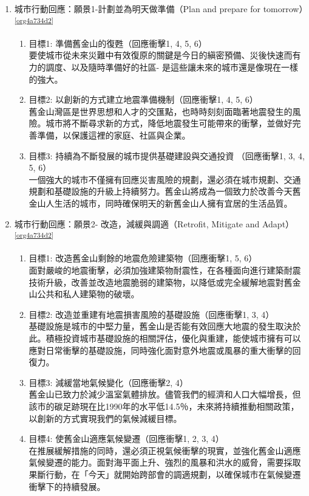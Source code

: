\documentclass[a4paper,12pt]{article}
\begin{document}
\begin{enumerate}
\begin{enumerate}
\item 城市行動回應：願景1-計劃並為明天做準備（Plan and prepare for tomorrow）\textsuperscript{\ref{org4a734d2}}
\label{sec:org3c67873}
\begin{enumerate}
\item 目標1: 準備舊金山的復甦（回應衝擊1, 4, 5, 6）\\
要使城市從未來災難中有效復原的關鍵是今日的縝密預備、災後快速而有力的調度、以及隨時準備好的社區- 是這些讓未來的城市還是像現在一樣的強大。\\
\item 目標2: 以創新的方式建立地震準備機制（回應衝擊1, 4, 5, 6）\\
舊金山灣區是世界思想和人才的交匯點，也時時刻刻面臨著地震發生的風險。城市將不斷尋求新的方式，降低地震發生可能帶來的衝擊，並做好完善準備，以保護這裡的家庭、社區與企業。\\
\item 目標3: 持續為不斷發展的城市提供基礎建設與交通投資 （回應衝擊1, 3, 4, 5, 6）\\
一個強大的城市不僅擁有回應災害風險的規劃，還必須在城市規劃、交通規劃和基礎設施的升級上持續努力。舊金山將成為一個致力於改善今天舊金山人生活的城市，同時確保明天的新舊金山人擁有宜居的生活品質。\\
\end{enumerate}

\item 城市行動回應：願景2- 改造，減緩與調適（Retrofit, Mitigate and Adapt）\textsuperscript{\ref{org4a734d2}}
\label{sec:org7d53db1}
\begin{enumerate}
\item 目標1: 改造舊金山剩餘的地震危險建築物（回應衝擊1, 5, 6）\\
面對嚴峻的地震衝擊，必須加強建築物耐震性，在各種面向進行建築耐震技術升級，改善並改造地震脆弱的建築物，以降低或完全緩解地震對舊金山公共和私人建築物的破壞。\\
\item 目標2: 改造並重建有地震損害風險的基礎設施（回應衝擊1, 3, 4）\\
基礎設施是城市的中堅力量，舊金山是否能有效回應大地震的發生取決於此。積極投資城市基礎設施的相關評估，優化與重建，能使城市擁有可以應對日常衝擊的基礎設施，同時強化面對意外地震或風暴的重大衝擊的回復力。\\
\item 目標3: 減緩當地氣候變化（回應衝擊2, 4）\\
舊金山已致力於減少溫室氣體排放。儘管我們的經濟和人口大幅增長，但該市的碳足跡現在比1990年的水平低14.5％，未來將持續推動相關政策，以創新的方式實現我們的氣候減緩目標。\\
\item 目標4: 使舊金山適應氣候變遷（回應衝擊1, 2, 3, 4）\\
在推展緩解措施的同時，還必須正視氣候衝擊的現實，並強化舊金山適應氣候變遷的能力。面對海平面上升、強烈的風暴和洪水的威脅，需要採取果斷行動，在「今天」就開始跨部會的調適規劃，以確保城市在氣候變遷衝擊下的持續發展。\\
\end{enumerate}


\end{enumerate}
\end{enumerate}
\end{document}
